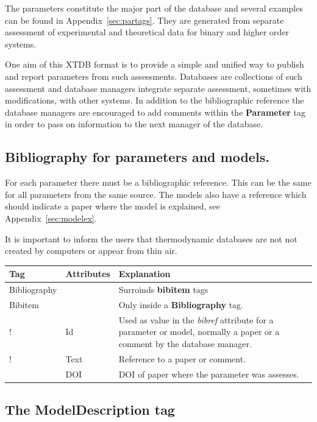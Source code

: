 \documentclass{article}
\begin{document}
The parameters constitute the major part of the database and several
examples can be found in Appendix~\ref{sec:partags}.  They are
generated from separate assessment of experimental and theoretical
data for binary and higher order systems.

One aim of this XTDB format is to provide a simple and unified way to
publish and report parameters from such assessments.  Databases are
collections of such assessment and database managers integrate
separate assessment, sometimes with modifications, with other systems.
In addition to the bibliographic reference the database managers are
encouraged to add comments within the {\bf Parameter} tag in order to
pass on information to the next manager of the database.

\newpage

\subsection{Bibliography for parameters and models.}\label{sec:biblio}

For each parameter there must be a bibliographic reference.  This can
be the same for all parameters from the same source.  The models also
have a reference which should indicate a paper where the model is
explained, see Appendix~\ref{sec:modelex}.

It is important to inform the users that thermodynamic databases are
not not created by computers or appear from thin air.

\bigskip
\begin{tabular}{|p{} p{} p{}|}\hline
  Tag & Attributes &  Explanation\\\hline

  Bibliography & & Surroinds {\bf bibitem} tags\\\hline

  Bibitem & & Only inside a {\bf Bibliography} tag.\\
!      & Id &   Used as value in the {\em bibref} attribute for a parameter
            or model, normally a paper or a comment by the database manager.\\
!      & Text & Reference to a paper or comment.\\
       & DOI & DOI of paper where the parameter was assesses.\\\hline
\end{tabular}

\newpage

\subsection{The ModelDescription tag}\label{sec:models}
\end{document}
